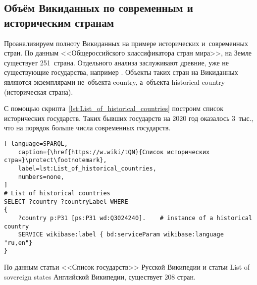 \subsection{Объём Викиданных по современным и историческим странам}

Проанализируем полноту Викиданных на примере исторических и~современных стран. 
По данным <<Общероссийского классификатора стран мира>>\autocite{oksm},
на Земле существует 251~страна. 
Отдельного анализа заслуживают древние, уже не существующие государства, 
например . 
Объекты таких стран на Викиданных являются экземплярами не~объекта country, 
а~объекта historical country (историческая страна). 

С помощью скрипта~\ref{lst:List_of_historical_countries} построим список исторических государств. 
Таких бывших государств на 2020 год оказалось 3~тыс., что на порядок больше числа современных государств.
%


\begin{lstlisting}[ language=SPARQL, 
    caption={\href{https://w.wiki/tQN}{Список исторических стран}\protect\footnotemark},
    label=lst:List_of_historical_countries, 
    numbers=none,
]
# List of historical countries
SELECT ?country ?countryLabel WHERE
{
    ?country p:P31 [ps:P31 wd:Q3024240].    # instance of a historical country 
    SERVICE wikibase:label { bd:serviceParam wikibase:language "ru,en"} 
}
\end{lstlisting}


По данным статьи <<Список государств>>\autocite{list_of_sovereign_states} Русской Википедии 
и статьи List of sovereign states\autocite{list_of_sovereign_states_en} Английской Википедии, 
существует 208 стран.


